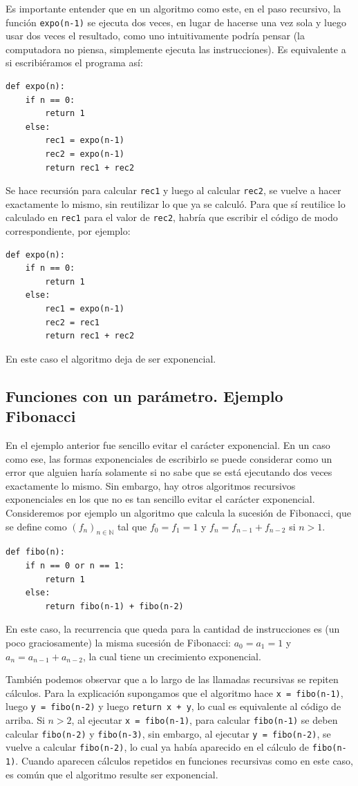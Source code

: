 \documentclass[a4paper, 12pt]{report}
\newcommand{\N}{\mathbb{N}}
\theoremstyle{definition}
\begin{document}
Es importante entender que en un algoritmo como este, en el paso recursivo, la función {\tt expo(n-1)} se ejecuta dos veces, en lugar de hacerse una vez sola y luego usar dos veces el resultado, como uno intuitivamente podría pensar (la computadora no piensa, simplemente ejecuta las instrucciones). Es equivalente a si escribiéramos el programa así:
\begin{verbatim}
def expo(n):
    if n == 0:
        return 1
    else:
        rec1 = expo(n-1)
        rec2 = expo(n-1)
        return rec1 + rec2
\end{verbatim}
Se hace recursión para calcular {\tt rec1} y luego al calcular {\tt rec2}, se vuelve a hacer exactamente lo mismo, sin reutilizar lo que ya se calculó. Para que sí reutilice lo calculado en {\tt rec1} para el valor de {\tt rec2}, habría que escribir el código de modo correspondiente, por ejemplo:
\begin{verbatim}
def expo(n):
    if n == 0:
        return 1
    else:
        rec1 = expo(n-1)
        rec2 = rec1
        return rec1 + rec2
\end{verbatim}
En este caso el algoritmo deja de ser exponencial.

\subsection{Funciones con un parámetro. Ejemplo Fibonacci}

En el ejemplo anterior fue sencillo evitar el carácter exponencial. En un caso como ese, las formas exponenciales de escribirlo se puede considerar como un error que alguien haría solamente si no sabe que se está ejecutando dos veces exactamente lo mismo. Sin embargo, hay otros algoritmos recursivos exponenciales en los que no es tan sencillo evitar el carácter exponencial. Consideremos por ejemplo un algoritmo que calcula la sucesión de Fibonacci, que se define como $(f_n)_{n\in\N}$ tal que $f_0=f_1=1$ y $f_n = f_{n-1} + f_{n-2}$ si $n>1$.
\begin{verbatim}
def fibo(n):
    if n == 0 or n == 1:
        return 1
    else:
        return fibo(n-1) + fibo(n-2)
\end{verbatim}
En este caso, la recurrencia que queda para la cantidad de instrucciones es (un poco graciosamente) la misma sucesión de Fibonacci: $a_0 = a_1 = 1$ y $a_n = a_{n-1}+a_{n-2}$, la cual tiene un crecimiento exponencial.

También podemos observar que a lo largo de las llamadas recursivas se repiten cálculos. Para la explicación supongamos que el algoritmo hace {\tt x = fibo(n-1)}, luego {\tt y = fibo(n-2)} y luego {\tt return x + y}, lo cual es equivalente al código de arriba. Si $n>2$, al ejecutar {\tt x = fibo(n-1)}, para calcular {\tt fibo(n-1)} se deben calcular {\tt fibo(n-2)} y {\tt fibo(n-3)}, sin embargo, al ejecutar {\tt y = fibo(n-2)}, se vuelve a calcular {\tt fibo(n-2)}, lo cual ya había aparecido en el cálculo de {\tt fibo(n-1)}. Cuando aparecen cálculos repetidos en funciones recursivas como en este caso, es común que el algoritmo resulte ser exponencial.
\end{document}

